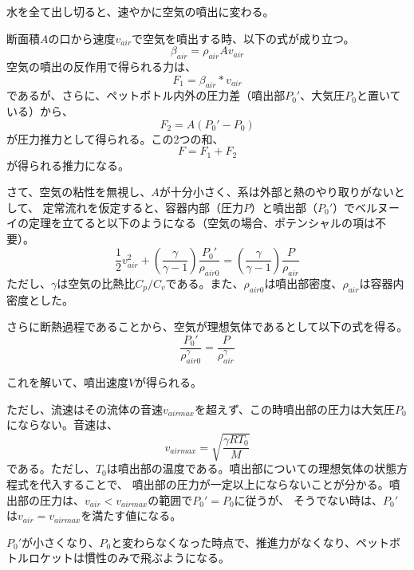 \documentclass{article}
\begin{document}
水を全て出し切ると、速やかに空気の噴出に変わる。

断面積$A$の口から速度$v_{air}$で空気を噴出する時、以下の式が成り立つ。
\begin{equation}
\beta_{air} = \rho_{air} A v_{air}
\end{equation}
空気の噴出の反作用で得られる力は、
\begin{equation}
F_1 = \beta_{air} * v_{air}
\end{equation}
であるが、さらに、ペットボトル内外の圧力差（噴出部$P_0'$、大気圧$P_0$と置いている）から、
\begin{equation}
F_2 = A \left( P_0' - P_0 \right)
\end{equation}
が圧力推力として得られる。この2つの和、
\begin{equation}
F = F_1 + F_2
\end{equation}
が得られる推力になる。

さて、空気の粘性を無視し、$A$が十分小さく、系は外部と熱のやり取りがないとして、
定常流れを仮定すると、容器内部（圧力$P$）と噴出部（$P_0'$）でベルヌーイの定理を立てると以下のようになる（空気の場合、ポテンシャルの項は不要）。
\begin{equation}
\frac{1}{2} v_{air}^2 + \left( \frac{\gamma}{\gamma - 1} \right)\frac{P_0'}{\rho_{air0}} =  \left( \frac{\gamma}{\gamma - 1} \right)\frac{P}{\rho_{air}}
\end{equation}
ただし、$\gamma$は空気の比熱比${C_p}/{C_v}$である。また、$\rho_{air0}$は噴出部密度、$\rho_{air}$は容器内密度とした。

さらに断熱過程であることから、空気が理想気体であるとして以下の式を得る。
\begin{equation}
\frac{P_0'}{\rho_{air0}^\gamma} = \frac{P}{\rho_{air}^\gamma}
\end{equation}

これを解いて、噴出速度$V$が得られる。

ただし、流速はその流体の音速$v_{airmax}$を超えず、この時噴出部の圧力は大気圧$P_0$にならない。音速は、
\begin{equation}
v_{airmax} = \sqrt{\frac{\gamma R T_0}{M}}
\end{equation}
である。ただし、$T_0$は噴出部の温度である。噴出部についての理想気体の状態方程式を代入することで、
噴出部の圧力が一定以上にならないことが分かる。噴出部の圧力は、$v_{air} < v_{airmax}$の範囲で$P_0'=P_0$に従うが、
そうでない時は、$P_0'$は$v_{air} = v_{airmax}$を満たす値になる。

$P_0'$が小さくなり、$P_0$と変わらなくなった時点で、推進力がなくなり、ペットボトルロケットは慣性のみで飛ぶようになる。
\end{document}
